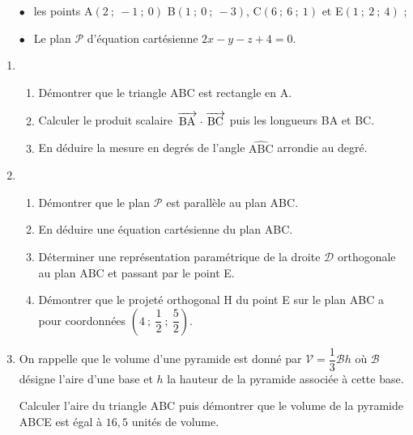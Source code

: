 \documentclass[11pt]{article}
\newcommand{\vect}[1]{\overrightarrow{\,\mathstrut#1\,}}
\begin{document}
\setlength\parindent{1cm}
\begin{itemize}
\item[$\bullet~~$]les points A$(2~;~-1~;~0)$ B$(1~;~0~;~- 3)$, C$(6~;~6~;~1)$  et E$(1~;~2~;~4)$ ;
\item[$\bullet~~$]Le plan $\mathcal{P}$ d'équation cartésienne $2x - y - z + 4 = 0$.
\end{itemize}
\setlength\parindent{0cm}

\medskip

\begin{enumerate}
\item
	\begin{enumerate}
		\item Démontrer que le triangle ABC est rectangle en A.
		\item Calculer le produit scalaire $\vect{\text{BA}} \cdot \vect{\text{BC}}$ puis les longueurs BA et BC.
		\item En déduire la mesure en degrés de l'angle $\widehat{\text{ABC}}$ arrondie au degré.
	\end{enumerate}
\item
	\begin{enumerate}
		\item Démontrer que le plan $\mathcal{P}$ est parallèle au plan ABC.
		\item En déduire une équation cartésienne du plan ABC.
		\item Déterminer une représentation paramétrique de la droite $\mathcal{D}$ orthogonale au plan ABC et passant par le point E.
		\item Démontrer que le projeté orthogonal H  du point E sur le plan ABC a pour coordonnées $\left(4~;~\dfrac{1}{2}~;~\dfrac{5}{2}\right)$.
	\end{enumerate}
\item On rappelle que le volume d'une pyramide est donné par $\mathcal{V} = \dfrac13 \mathcal{B}h$ où $\mathcal{B}$ désigne l'aire d'une base et $h$  la hauteur de la pyramide associée à cette base.

Calculer l'aire du triangle ABC puis démontrer que le volume de la pyramide ABCE est égal à $16,5$ unités de volume.
\end{enumerate}
\end{document}
